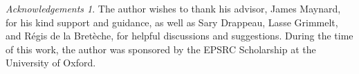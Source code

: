 \documentclass[reqno,11pt]{amsart}
\theoremstyle{definition}
\theoremstyle{remark}
\newtheorem*{acknowledgements}{Acknowledgements}
\numberwithin{equation}{section}
\begin{document}
\begin{acknowledgements}
The author wishes to thank his advisor, James Maynard, for his kind support and guidance, as well as Sary Drappeau, Lasse Grimmelt, and R\'egis de la Bret\`eche, for helpful discussions and suggestions.
During the time of this work, the author was sponsored by the EPSRC Scholarship at the University of Oxford.
\end{acknowledgements}










\end{document}

